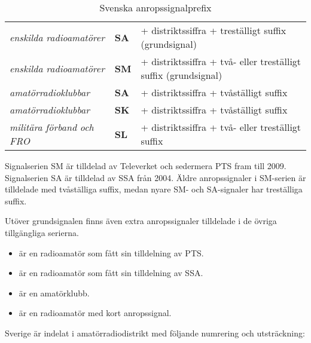 \begin{table*}[ht]
  \begin{center}
    \begin{tabular}{lll}
      \emph{enskilda radioamatörer} & \textbf{SA} &
      + distriktssiffra + treställigt suffix (grundsignal) \\
      \emph{enskilda radioamatörer} & \textbf{SM} &
      + distriktssiffra + två- eller treställigt suffix (grundsignal) \\
      \emph{amatörradioklubbar} & \textbf{SA} &
      + distriktssiffra + tvåställigt suffix \\
      \emph{amatörradioklubbar} & \textbf{SK} &
      + distriktssiffra + tvåställigt suffix \\
      \emph{militära förband och FRO} & \textbf{SL} &
      + distriktssiffra + två- eller treställigt suffix \\
    \end{tabular}
    \caption{Svenska anropssignalprefix}
    \label{tab:seprefix}
  \end{center}
\end{table*}

Signalserien SM är tilldelad av Televerket och sedermera PTS fram till 2009.
Signalserien SA är tilldelad av SSA från 2004.
Äldre anropssignaler i SM-serien är tilldelade med tvåställiga suffix, medan
nyare SM- och SA-signaler har treställiga suffix.

Utöver grundsignalen finns även extra anropssignaler tilldelade i de övriga
tillgängliga serierna.

\begin{exempelbox}
	\begin{itemize}
		\item {} är en radioamatör som fått sin tilldelning av PTS.
		\item {} är en radioamatör som fått sin tilldelning av SSA.
		\item {} är en amatörklubb.
		\item {} är en radioamatör med kort anropssignal.
	\end{itemize}
\end{exempelbox}

\medskip

Sverige är indelat i amatörradiodistrikt med följande numrering och
utsträckning:

